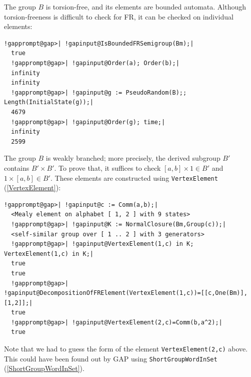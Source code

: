 \documentclass[a4paper,11pt]{report}
\begin{document}
{{ The group $B$ is torsion-free, and its elements are bounded automata. Although
torsion-freeness is difficult to check for \textsf{FR}, it can be checked on individual elements: 
\begin{Verbatim}[commandchars=!@|,fontsize=\small,frame=single,label=Example]
  !gapprompt@gap>| !gapinput@IsBoundedFRSemigroup(Bm);|
  true
  !gapprompt@gap>| !gapinput@Order(a); Order(b);|
  infinity
  infinity
  !gapprompt@gap>| !gapinput@g := PseudoRandom(B);; Length(InitialState(g));|
  4679
  !gapprompt@gap>| !gapinput@Order(g); time;|
  infinity
  2599
\end{Verbatim}
 

 The group $B$ is weakly branched; more precisely, the derived subgroup $B'$ contains $B' \times B'$. To prove that, it suffices to check $[a,b] \times 1\in B'$ and $1 \times [a,b]\in B'$. These elements are constructed using \texttt{VertexElement} (\ref{VertexElement}): 
\begin{Verbatim}[commandchars=!@|,fontsize=\small,frame=single,label=Example]
  !gapprompt@gap>| !gapinput@c := Comm(a,b);|
  <Mealy element on alphabet [ 1, 2 ] with 9 states>
  !gapprompt@gap>| !gapinput@K := NormalClosure(Bm,Group(c));|
  <self-similar group over [ 1 .. 2 ] with 3 generators>
  !gapprompt@gap>| !gapinput@VertexElement(1,c) in K; VertexElement(1,c) in K;|
  true
  true
  !gapprompt@gap>| !gapinput@DecompositionOfFRElement(VertexElement(1,c))=[[c,One(Bm)],[1,2]];|
  true
  !gapprompt@gap>| !gapinput@VertexElement(2,c)=Comm(b,a^2);|
  true
\end{Verbatim}
 Note that we had to guess the form of the element \texttt{VertexElement(2,c)} above. This could have been found out by \textsf{GAP} using \texttt{ShortGroupWordInSet} (\ref{ShortGroupWordInSet}). 

}}
\end{document}
